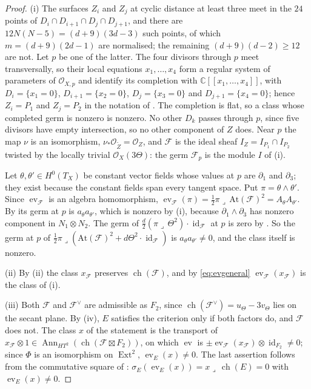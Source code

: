 \documentclass[11pt,reqno]{amsart}
\theoremstyle{plain}
\theoremstyle{definition}
\theoremstyle{remark}
\newcommand{\CC}{\mathbb{C}}
\newcommand{\cF}{\mathcal{F}}
\newcommand{\cO}{\mathcal{O}}
\DeclareMathOperator{\ch}{ch}
\DeclareMathOperator{\Ext}{Ext}
\DeclareMathOperator{\id}{id}
\DeclareMathOperator{\Ann}{Ann}
\begin{document}
\begin{proof}
(i) The surfaces $Z_{i}$ and $Z_{j}$ at cyclic distance at least three meet
in the $24$ points of $D_{i}\cap D_{i+1}\cap D_{j}\cap D_{j+1}$, and there are
$12N(N-5)=(d+9)(3d-3)$ such points, of which $m=(d+9)(2d-1)$ are normalised;
the remaining $(d+9)(d-2)\ge12$ are not. Let $p$ be one of the latter. The
four divisors through $p$ meet transversally, so their local equations
$x_{1},\dots,x_{4}$ form a regular system of parameters of $\cO_{X,p}$ and
identify its completion with $\CC[[x_{1},\dots,x_{4}]]$, with
$D_{i}=\{x_{1}=0\}$, $D_{i+1}=\{x_{2}=0\}$, $D_{j}=\{x_{3}=0\}$ and
$D_{j+1}=\{x_{4}=0\}$; hence $Z_{i}=P_{1}$ and $Z_{j}=P_{2}$ in the
notation of . The completion is flat, so a class
whose completed germ is nonzero is nonzero. No other $D_{k}$ passes through
$p$, since five divisors have empty intersection, so no other component of
$Z$ does. Near $p$ the map $\nu$ is an isomorphism,
$\nu_{*}\cO_{\widetilde Z}=\cO_{Z}$, and $\cF$ is the ideal sheaf
$I_{Z}=I_{P_{1}}\cap I_{P_{2}}$ twisted by the locally trivial $\cO_{X}(3\Theta)$:
the germ $\cF_{p}$ is the module $I$ of (i).

Let $\theta,\theta'\in H^{0}(T_{X})$ be constant vector fields whose values
at $p$ are $\partial_{1}$ and $\partial_{3}$; they exist because the constant
fields span every tangent space. Put $\pi=\theta\wedge\theta'$. Since
$\operatorname{ev}_{\cF}$ is an algebra homomorphism,
$\operatorname{ev}_{\cF}(\pi)=\tfrac12\pi\lrcorner\,\mathrm{At}(\cF)^{2}
=A_{\theta}A_{\theta'}$. By  its germ at $p$ is
$a_{\theta}a_{\theta'}$, which is nonzero by (i),
because $\partial_{1}\wedge\partial_{3}$ has nonzero component in
$N_{1}\otimes N_{2}$. The germ of
$\tfrac d2(\pi\lrcorner\,\Theta^{2})\cdot\id_{\cF}$ at $p$ is zero by
. So the germ at $p$ of
$\tfrac12\pi\lrcorner(\mathrm{At}(\cF)^{2}+d\Theta^{2}\cdot\id_{\cF})$ is
$a_{\theta}a_{\theta'}\ne0$, and the class itself is nonzero.

(ii) By (ii) the class $x_{\cF}$ preserves $\ch(\cF)$, and by
\eqref{eq:evgeneral} $\operatorname{ev}_{\cF}(x_{\cF})$ is the class of (i).

(iii) Both $\cF$ and $\cF^{\vee}$ are admissible as $F_{2}$, since
$\ch(\cF^{\vee})=u_{\Theta}-3v_{\Theta}$ lies on the secant plane. By
(iv), $E$ satisfies the criterion only if both factors do,
and $\cF$ does not. The class $x$ of the statement is the transport of
$x_{\cF}\otimes1\in\Ann_{HT^{2}}(\ch(\cF\boxtimes F_{2}))$, on which
$\operatorname{ev}$ is $\pm\operatorname{ev}_{\cF}(x_{\cF})\otimes\id_{F_{2}}\ne0$;
since $\Phi$ is an isomorphism on $\Ext^{2}$, $\operatorname{ev}_{E}(x)\ne0$.
The last assertion follows from the commutative square of
: $\sigma_{E}(\operatorname{ev}_{E}(x))=x\lrcorner\,\ch(E)=0$
with $\operatorname{ev}_{E}(x)\ne0$.
\end{proof}
\end{document}
